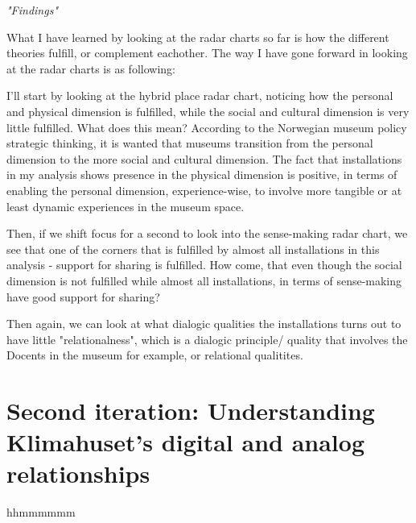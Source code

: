 \emph{"Findings"}
\par

What I have learned by looking at the radar charts so far is how the different theories fulfill, or complement eachother. The way I have gone forward in looking at the radar charts is as following:
\par I'll start by looking at the hybrid place radar chart, noticing how the personal and physical dimension is fulfilled, while the social and cultural dimension is very little fulfilled. What does this mean? According to the Norwegian museum policy strategic thinking, it is wanted that museums transition from the personal dimension to the more social and cultural dimension. The fact that installations in my analysis shows presence in the physical dimension is positive, in terms of enabling the personal dimension, experience-wise, to involve more tangible or at least dynamic experiences in the museum space.
\par Then, if we shift focus for a second to look into the sense-making radar chart, we see that one of the corners that is fulfilled by almost all installations in this analysis - support for sharing is fulfilled. How come, that even though the social dimension is not fulfilled while almost all installations, in terms of sense-making have good support for sharing? 

\par Then again, we can look at what dialogic qualities the installations turns out to have little "relationalness", which is a dialogic principle/ quality that involves the Docents in the museum for example, or relational qualitites.


\section{Second iteration: Understanding Klimahuset's digital and analog relationships}

hhmmmmmm

